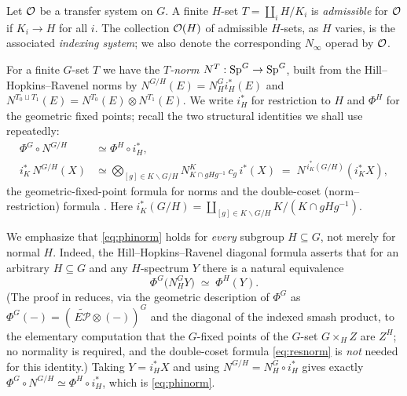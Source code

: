 \begin{qfivedefinition}
Let $\mathcal{O}$ be a transfer system on $G$. A finite $H$-set $T=\coprod_i H/K_i$ is
\emph{admissible} for $\mathcal{O}$ if $K_i\to H$ for all $i$. The collection $\mathcal{O}(H)$ of
admissible $H$-sets, as $H$ varies, is the associated \emph{indexing system}; we
also denote the corresponding $N_\infty$ operad by $\mathcal{O}$.
\end{qfivedefinition}

For a finite $G$-set $T$ we have the \emph{$T$-norm}
$N^T:\mathrm{Sp}^G\to\mathrm{Sp}^G$, built from the Hill--Hopkins--Ravenel norms \cite{HHR16}
by $N^{G/H}(E)=N^G_H i_H^\ast(E)$ and $N^{T_0\sqcup T_1}(E)=N^{T_0}(E)\otimes
N^{T_1}(E)$. We write $i_H^\ast$ for restriction to $H$ and $\Phi^H$ for the
geometric fixed points; recall the two structural identities we shall use
repeatedly:
\begin{align}
\Phi^G\circ N^{G/H} &\simeq \Phi^H\circ i_H^\ast , \label{eq:phinorm}\\
i_K^\ast\, N^{G/H}(X) &\simeq \bigotimes_{[g]\in K\backslash G/H}
   N^{K}_{K\cap gHg^{-1}}\, c_g\, i^\ast(X)
   \;=\; N^{\,i_K^\ast(G/H)}(i_K^\ast X), \label{eq:resnorm}
\end{align}
the geometric-fixed-point formula for norms \cite[Prop.~B.96]{HHR16} and the
double-coset (norm--restriction) formula \cite[Prop.~B.93]{HHR16}. Here
$i_K^\ast(G/H)=\coprod_{[g]\in K\backslash G/H} K/(K\cap gHg^{-1})$.

\begin{qfiveremark}\label{rem:phinorm-general}
We emphasize that \eqref{eq:phinorm} holds for \emph{every} subgroup
$H\subseteq G$, not merely for normal $H$. Indeed, the Hill--Hopkins--Ravenel
diagonal formula \cite[Prop.~B.96]{HHR16} asserts that for an arbitrary
$H\subseteq G$ and any $H$-spectrum $Y$ there is a natural equivalence
\[
\Phi^G\bigl(N^G_H Y\bigr)\;\simeq\;\Phi^H(Y).
\]
(The proof in \cite{HHR16} reduces, via the geometric description of $\Phi^G$ as
$\Phi^G(-)=(\,\widetilde{E\mathcal P}\otimes(-))^G$ and the diagonal of the indexed
smash product, to the elementary computation that the $G$-fixed points of the
$G$-set $G\times_H Z$ are $Z^H$; no normality is required, and the double-coset
formula \eqref{eq:resnorm} is \emph{not} needed for this identity.) Taking
$Y=i_H^\ast X$ and using $N^{G/H}=N^G_H\circ i_H^\ast$ gives exactly
$\Phi^G\circ N^{G/H}\simeq\Phi^H\circ i_H^\ast$, which is \eqref{eq:phinorm}.
\end{qfiveremark}

